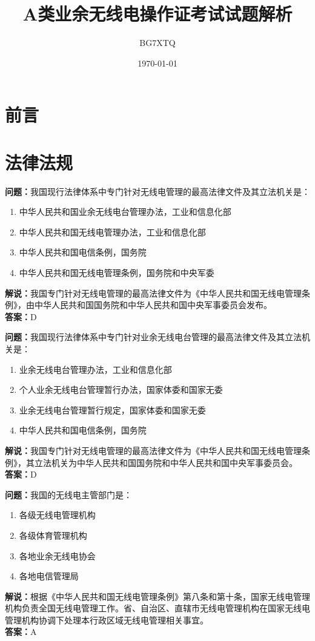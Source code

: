 \documentclass[UTF8]{ctexbook}
\title{A类业余无线电操作证考试试题解析}%
\author{BG7XTQ}%
\date{\today}%
\begin{document}

\maketitle%
\tableofcontents%

\chapter*{前言}

\chapter{法律法规}

\textbf{问题：}我国现行法律体系中专门针对无线电管理的最高法律文件及其立法机关是：
\begin{enumerate}[label=\Alph*), leftmargin=3em]
  \item 中华人民共和国业余无线电台管理办法，工业和信息化部
  \item 中华人民共和国无线电管理办法，工业和信息化部
  \item 中华人民共和国电信条例，国务院
  \item 中华人民共和国无线电管理条例，国务院和中央军委
\end{enumerate}
\textbf{解说：}我国专门针对无线电管理的最高法律文件为《中华人民共和国无线电管理条例》，由中华人民共和国国务院和中华人民共和国中央军事委员会发布。\\
\textbf{答案：}D

\textbf{问题：}我国现行法律体系中专门针对业余无线电台管理的最高法律文件及其立法机关是：
\begin{enumerate}[label=\Alph*), leftmargin=3em]
  \item 业余无线电台管理办法，工业和信息化部
  \item 个人业余无线电台管理暂行办法，国家体委和国家无委
  \item 业余无线电台管理暂行规定，国家体委和国家无委
  \item 中华人民共和国电信条例，国务院
\end{enumerate}
\textbf{解说：}我国专门针对无线电管理的最高法律文件为《中华人民共和国无线电管理条例》，其立法机关为中华人民共和国国务院和中华人民共和国中央军事委员会。\\
\textbf{答案：}D

\textbf{问题：}我国的无线电主管部门是：
\begin{enumerate}[label=\Alph*), leftmargin=3em]
  \item 各级无线电管理机构
  \item 各级体育管理机构
  \item 各地业余无线电协会
  \item 各地电信管理局
\end{enumerate}
\textbf{解说：}根据《中华人民共和国无线电管理条例》第八条和第十条，国家无线电管理机构负责全国无线电管理工作。省、自治区、直辖市无线电管理机构在国家无线电管理机构协调下处理本行政区域无线电管理相关事宜。\\
\textbf{答案：}A
\end{document}
